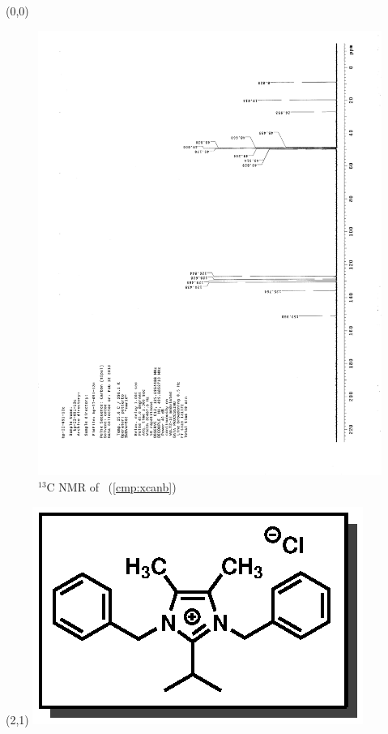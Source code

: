 \clearpage
\begin{textblock}{20}(0,0)
\begin{figure}[htb]
\caption{$^{13}$C NMR of  \CMPxcanb\ (\ref{cmp:xcanb})}
\includegraphics[scale=0.75, trim = 0mm 0mm 0mm 5mm,
clip]{chp_alkylation/images/nmr/xcanbC}
\vspace{-100pt}
\end{figure}
\end{textblock}
\begin{textblock}{1}(2,1)
\includegraphics[scale=0.8, angle=90]{chp_alkylation/images/xcanb}
\end{textblock}
\clearpage
